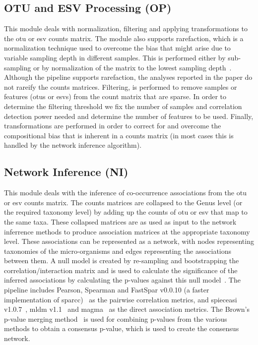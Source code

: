   \subsection*{OTU and ESV Processing (OP)}
  \vspace{-5mm}
  This module deals with normalization, filtering and applying transformations to the \ac{otu} or \ac{esv} counts matrix.
  The module also supports rarefaction, which is a normalization technique used to overcome the bias that might arise due to variable sampling depth in different samples.
  This is performed either by sub-sampling or by normalization of the matrix to the lowest sampling depth~\cite{Weiss2015}.
  Although the pipeline supports rarefaction, the analyses reported in the paper do not rareify the counts matrices.
  Filtering, is performed to remove samples or features (\ac{otu}s or \ac{esv}s) from the count matrix that are sparse.
  In order to determine the filtering threshold we fix the number of samples and correlation detection power needed and determine the number of features to be used.
  Finally, transformations are performed in order to correct for and overcome the compositional bias that is inherent in a counts matrix (in most cases this is handled by the network inference algorithm).

  \subsection*{Network Inference (NI)}
  \vspace{-5mm}
  This module deals with the inference of co-occurrence associations from the \ac{otu} or \ac{esv} counts matrix.
  The counts matrices are collapsed to the Genus level (or the required taxonomy level) by adding up the counts of \ac{otu} or \ac{esv} that map to the same taxa.
  These collapsed matrices are as used as input to the network inferrence methods to produce association matrices at the appropriate taxonomy level.
  These associations can be represented as a network, with nodes representing taxonomies of the micro-organisms and edges representing the associations between them.
  A null model is created by re-sampling and bootstrapping the correlation/interaction matrix and is used to calculate the significance of the inferred associations by calculating the p-values against this null model~\cite{Watts2018}.
  The pipeline includes Pearson, Spearman and FastSpar v0.0.10 (a faster implementation of \ac{sparcc})~\cite{Watts2018} as the pairwise correlation metrics, and \ac{spieceasi} v1.0.7~\cite{Kurtz2015}, \ac{mldm} v1.1~\cite{Yang2017} and \ac{magma}~\cite{Cougoul2019} as the direct association metrics.
  The Brown's p-value merging method~\cite{brown_400_1975} is used for combining p-values from the various methods to obtain a consensus p-value, which is used to create the consensus network.

